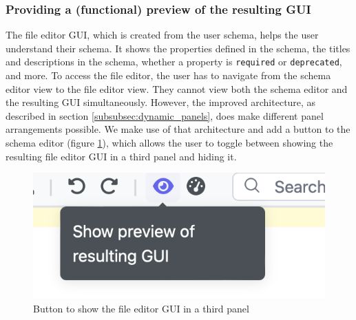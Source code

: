\subsubsection{Providing a (functional) preview of the resulting GUI}

The file editor GUI, which is created from the user schema, helps the user understand their schema.
It shows the properties defined in the schema, the titles and descriptions in the schema, whether a property is \texttt{required} or \texttt{deprecated}, and more.
To access the file editor, the user has to navigate from the schema editor view to the file editor view.
They cannot view both the schema editor and the resulting GUI simultaneously.
However, the improved architecture, as described in section \ref{subsubsec:dynamic_panels}, does make different panel arrangements possible.
We make use of that architecture and add a button to the schema editor (figure \ref{fig:schema_editor_show_preview}), which allows the user to toggle between showing the resulting file editor GUI in a third panel and hiding it. 


\begin{figure}[!t]
    \centering
    \includegraphics[width=0.5\columnwidth]{figures/schema_editor_show_preview}
    \caption{Button to show the file editor GUI in a third panel}
    \label{fig:schema_editor_show_preview}
\end{figure}
